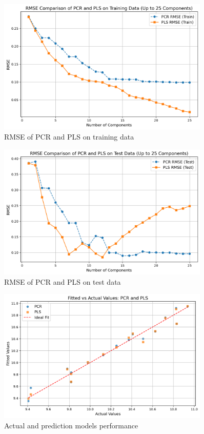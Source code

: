 \documentclass[11pt,twoside,a4paper]{article}
\begin{document}
\begin{figure}[H]
    \centering
    \includegraphics[width=0.9\textwidth]{NIR_second_plot.png}
    \caption{RMSE of PCR and PLS on training data}
    \label{fig:NIR_analysis}
\end{figure}

\begin{figure}[H]
    \centering
    \includegraphics[width=0.9\textwidth]{NIR_third_plot.png}
    \caption{RMSE of PCR and PLS on test data}
    \label{fig:NIR_analysis}
\end{figure}

\begin{figure}[H]
    \centering
    \includegraphics[width=0.9\textwidth]{NIR_fifth_plot.png}
    \caption{Actual and prediction models performance}
    \label{fig:NIR_analysis}
\end{figure}
\end{document}
